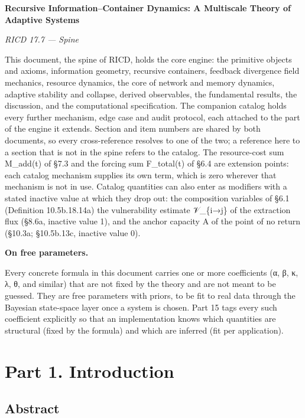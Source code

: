 \documentclass[
]{article}
\author{}
\date{}
\begin{document}
\textbf{Recursive Information--Container Dynamics: A Multiscale Theory
of Adaptive Systems}

\emph{RICD 17.7 --- Spine}

This document, the spine of RICD, holds the core engine: the primitive
objects and axioms, information geometry, recursive containers, feedback
divergence field mechanics, resource dynamics, the core of network and
memory dynamics, adaptive stability and collapse, derived observables,
the fundamental results, the discussion, and the computational
specification. The companion catalog holds every further mechanism, edge
case and audit protocol, each attached to the part of the engine it
extends. Section and item numbers are shared by both documents, so every
cross-reference resolves to one of the two; a reference here to a
section that is not in the spine refers to the catalog. The
resource-cost sum M\_add(t) of §7.3 and the forcing sum F\_total(t) of
§6.4 are extension points: each catalog mechanism supplies its own term,
which is zero wherever that mechanism is not in use. Catalog quantities
can also enter as modifiers with a stated inactive value at which they
drop out: the composition variables of §6.1 (Definition 10.5b.18.14a)
the vulnerability estimate 𝒱\_\{i→j\} of the extraction flux (§8.6a,
inactive value 1), and the anchor capacity A of the point of no return
(§10.3a; §10.5b.13c, inactive value 0).

\textbf{On free parameters.}

Every concrete formula in this document carries one or more coefficients
(α, β, κ, λ, θ, and similar) that are not fixed by the theory and are
not meant to be guessed. They are free parameters with priors, to be fit
to real data through the Bayesian state-space layer once a system is
chosen. Part 15 tags every such coefficient explicitly so that an
implementation knows which quantities are structural (fixed by the
formula) and which are inferred (fit per application).

\hypertarget{part-1.-introduction}{%
\section{Part 1. Introduction}\label{part-1.-introduction}}

\hypertarget{abstract}{%
\subsection{Abstract}\label{abstract}}
\end{document}
